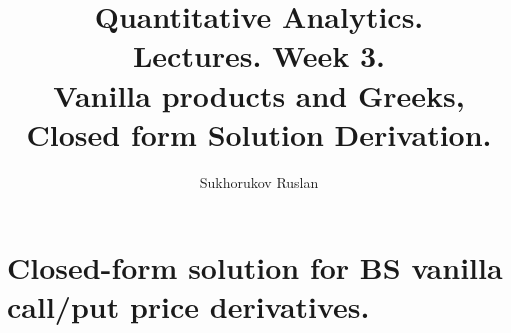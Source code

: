 \documentclass{article}
\title{Quantitative Analytics.\\
Lectures. Week 3. \\
Vanilla products and Greeks, Closed form Solution Derivation.}
\author{Sukhorukov Ruslan}
\begin{document}
\maketitle

\setcounter{tocdepth}{1} %
\renewcommand\contentsname{Contents}
\tableofcontents
\newpage




\renewcommand{\labelitemi}{\tiny$\bullet$}
\renewcommand{\figurename}{Fig.}

 \section{Closed-form solution for BS vanilla call/put price derivatives. \\ }
\end{document}
